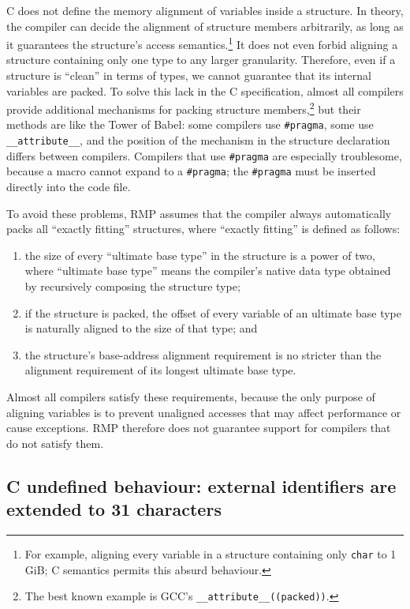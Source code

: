 C does not define the memory alignment of variables inside a structure.
In theory, the compiler can decide the alignment of structure members arbitrarily, as long as it guarantees the structure's access semantics.\footnote{For example, aligning every variable in a structure containing only \texttt{char} to 1\,GiB; C semantics permits this absurd behaviour.}
It does not even forbid aligning a structure containing only one type to any larger granularity.
Therefore, even if a structure is ``clean'' in terms of types, we cannot guarantee that its internal variables are packed.
To solve this lack in the C specification, almost all compilers provide additional mechanisms for packing structure members,\footnote{The best known example is GCC's \texttt{\_\_attribute\_\_((packed))}.} but their methods are like the Tower of Babel: some compilers use \texttt{\#pragma}, some use \texttt{\_\_attribute\_\_}, and the position of the mechanism in the structure declaration differs between compilers.
Compilers that use \texttt{\#pragma} are especially troublesome, because a macro cannot expand to a \texttt{\#pragma}; the \texttt{\#pragma} must be inserted directly into the code file.

To avoid these problems, RMP assumes that the compiler always automatically packs all ``exactly fitting'' structures, where ``exactly fitting'' is defined as follows:

\begin{enumerate}
    \item the size of every ``ultimate base type'' in the structure is a power of two, where ``ultimate base type'' means the compiler's native data type obtained by recursively composing the structure type;
    \item if the structure is packed, the offset of every variable of an ultimate base type is naturally aligned to the size of that type; and
    \item the structure's base-address alignment requirement is no stricter than the alignment requirement of its longest ultimate base type.
\end{enumerate}

Almost all compilers satisfy these requirements, because the only purpose of aligning variables is to prevent unaligned accesses that may affect performance or cause exceptions.
RMP therefore does not guarantee support for compilers that do not satisfy them.

\subsection{C undefined behaviour: external identifiers are extended to 31 characters}

